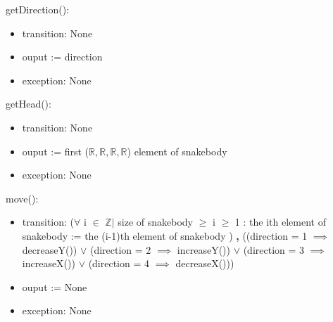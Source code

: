 \documentclass[12pt, titlepage]{article}
\begin{document}
\noindent getDirection():
\begin{itemize}
\item transition: None
\item ouput := direction
\item exception: None\\
\end{itemize}

\noindent getHead():
\begin{itemize}
\item transition: None
\item ouput := first ($\mathbb{R}, \mathbb{R}, \mathbb{R}, \mathbb{R}$) element of snakebody
\item exception: None\\
\end{itemize}

\noindent move():
\begin{itemize}
\item transition: ($\forall$ i $\in$ $\mathbb{Z} |$ size of snakebody $\geq$ i $\geq$ 1  : the ith element of snakebody := the (i-1)th element of snakebody ) \textbf{,} ((direction = 1 $\implies$ decreaseY()) $\lor$ (direction = 2 $\implies$ increaseY()) $\lor$ (direction = 3 $\implies$ increaseX()) $\lor$ (direction = 4 $\implies$ decreaseX()))
\item ouput := None
\item exception: None\\
\end{itemize}
\end{document}
